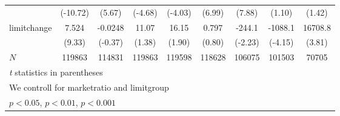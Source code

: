 {\begin{tabular}{l*{8}{c}}
            &    (-10.72)         &      (5.67)         &     (-4.68)         &     (-4.03)         &      (6.99)         &      (7.88)         &      (1.10)         &      (1.42)         \\
[1em]
limitchange &       7.524\sym{***}&     -0.0248         &       11.07         &       16.15         &       0.797         &      -244.1\sym{*}  &     -1088.1\sym{***}&     16708.8\sym{***}\\
            &      (9.33)         &     (-0.37)         &      (1.38)         &      (1.90)         &      (0.80)         &     (-2.23)         &     (-4.15)         &      (3.81)         \\
\hline
\(N\)       &      119863         &      114831         &      119863         &      119598         &      118628         &      106075         &      101503         &       70705         \\
\hline\hline
\multicolumn{9}{l}{\footnotesize \textit{t} statistics in parentheses}\\
\multicolumn{9}{l}{\footnotesize We controll for marketratio and limitgroup}\\
\multicolumn{9}{l}{\footnotesize \sym{*} \(p<0.05\), \sym{**} \(p<0.01\), \sym{***} \(p<0.001\)}\\
\end{tabular}
}
